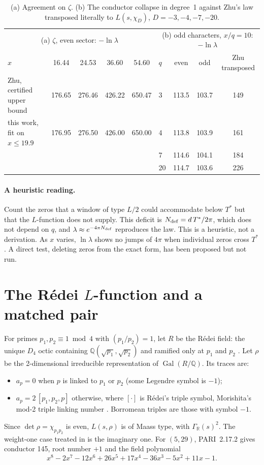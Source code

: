 \documentclass[11pt]{article}
\theoremstyle{remark}
\begin{document}
\begin{table}[h]
\centering\small
\begin{tabular}{@{}lcccc@{\qquad}lccc@{}}
\toprule
\multicolumn{5}{c}{(a) $\zeta$, even sector: $-\ln\lambda$} & \multicolumn{4}{c}{(b) odd characters, $x/q=10$: $-\ln\lambda$}\\
$x$ & 16.44 & 24.53 & 36.60 & 54.60 & $q$ & even & odd & Zhu transposed\\
\midrule
Zhu, certified upper bound & 176.65 & 276.46 & 426.22 & 650.47 & 3 & 113.5 & 103.7 & 149\\
this work, fit on $x\le19.9$ & 176.95 & 276.50 & 426.00 & 650.00 & 4 & 113.8 & 103.9 & 161\\
 & & & & & 7 & 114.6 & 104.1 & 184\\
 & & & & & 20 & 114.7 & 103.6 & 226\\
\bottomrule
\end{tabular}
\caption{(a) Agreement on $\zeta$. (b) The conductor collapse in degree~1 against Zhu's law transposed literally to $L(s,\chi_D)$, $D=-3,-4,-7,-20$.}\label{tab:zhu}
\end{table}

\paragraph{A heuristic reading.} Count the zeros that a window of type $L/2$ could accommodate below $T^*$ but that the $L$-function does not supply. This deficit is $N_{\rm def}=d\,T^*/2\pi$, which does not depend on $q$, and $\lambda\approx e^{-4\pi N_{\rm def}}$ reproduces the law. This is a heuristic, not a derivation. As $x$ varies, $\ln\lambda$ shows no jumps of $4\pi$ when individual zeros cross $T^*$. A direct test, deleting zeros from the exact form, has been proposed but not run.

\section{The Rédei $L$-function and a matched pair}\label{sec:redei}

For primes $p_1,p_2\equiv1\bmod4$ with $(p_1/p_2)=1$, let $R$ be the Rédei field: the unique $D_4$ octic containing $\mathbb Q(\sqrt{p_1},\sqrt{p_2})$ and ramified only at $p_1$ and $p_2$ \cite{redei39}. Let $\rho$ be the 2-dimensional irreducible representation of $\operatorname{Gal}(R/\mathbb Q)$. Its traces are:
\begin{itemize}
\item $a_p=0$ when $p$ is linked to $p_1$ or $p_2$ (some Legendre symbol is $-1$);
\item $a_p=2\,[p_1,p_2,p]$ otherwise, where $[\cdot]$ is Rédei's triple symbol, Morishita's mod-2 triple linking number \cite{morishita}. Borromean triples are those with symbol $-1$.
\end{itemize}
Since $\det\rho=\chi_{p_1p_2}$ is even, $L(s,\rho)$ is of Maass type, with $\Gamma_{\mathbb R}(s)^2$. The weight-one case treated in \cite{amano13} is the imaginary one. For $(5,29)$, PARI~2.17.2 gives conductor 145, root number $+1$ and the field polynomial
\[
x^8-2x^7-12x^6+26x^5+17x^4-36x^3-5x^2+11x-1.
\]
\end{document}
